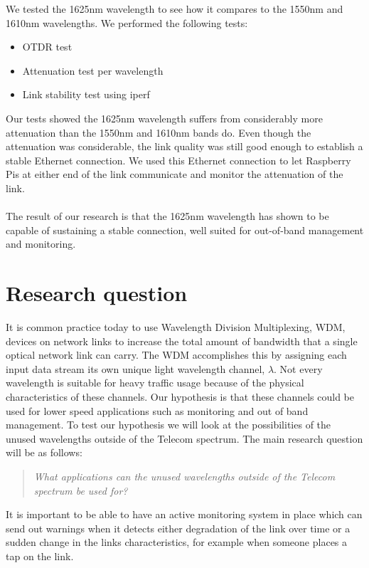 \documentclass{article}
\begin{document}
We tested the 1625nm wavelength to see how it compares to the 1550nm and 1610nm wavelengths.
We performed the following tests:
\begin{itemize}
	\item OTDR test
	\item Attenuation test per wavelength
	\item Link stability test using iperf
\end{itemize}
Our tests showed the 1625nm wavelength suffers from considerably more attenuation than the 1550nm and 1610nm bands do.
Even though the attenuation was considerable, the link quality was still good enough to establish a stable Ethernet connection.
We used this Ethernet connection to let Raspberry Pis at either end of the link communicate and monitor the attenuation of the link.\\
\\
The result of our research is that the 1625nm wavelength has shown to be capable of sustaining a stable connection, well suited for out-of-band management and monitoring.
\newpage
\tableofcontents
\newpage

\section{Research question}
It is common practice today to use Wavelength Division Multiplexing, WDM, devices on network links to increase the total amount of bandwidth that a single optical network link can carry. The WDM accomplishes this by assigning each input data stream its own unique light wavelength channel, $\lambda$. 
Not every wavelength is suitable for heavy traffic usage because of the physical characteristics of these channels. Our hypothesis is that these channels could be used for lower speed applications such as monitoring and out of band management.
To test our hypothesis we will look at the possibilities of the unused wavelengths outside of the Telecom spectrum.
The main research question will be as follows:
\begin{quote}
\textit{
What applications can the unused wavelengths outside of the Telecom spectrum be used for?
}
\end{quote}

It is important to be able to have an active monitoring system in place which can send out warnings when it detects either degradation of the link over time or a sudden change in the links characteristics, for example when someone places a tap on the link. 
\end{document}
